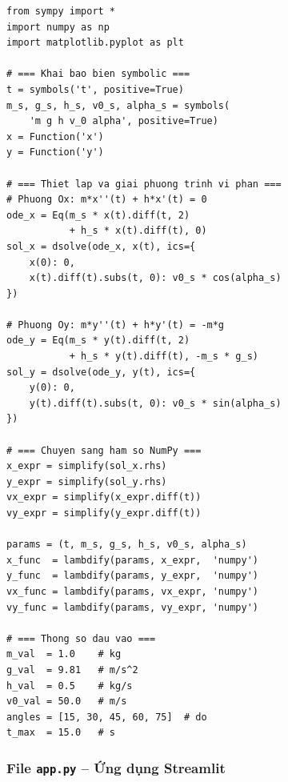 \begin{lstlisting}[style=pythonstyle, caption={Giải hệ phương trình vi phân và thiết lập hàm tính toán}]
from sympy import *
import numpy as np
import matplotlib.pyplot as plt

# === Khai bao bien symbolic ===
t = symbols('t', positive=True)
m_s, g_s, h_s, v0_s, alpha_s = symbols(
    'm g h v_0 alpha', positive=True)
x = Function('x')
y = Function('y')

# === Thiet lap va giai phuong trinh vi phan ===
# Phuong Ox: m*x''(t) + h*x'(t) = 0
ode_x = Eq(m_s * x(t).diff(t, 2) 
           + h_s * x(t).diff(t), 0)
sol_x = dsolve(ode_x, x(t), ics={
    x(0): 0,
    x(t).diff(t).subs(t, 0): v0_s * cos(alpha_s)
})

# Phuong Oy: m*y''(t) + h*y'(t) = -m*g
ode_y = Eq(m_s * y(t).diff(t, 2) 
           + h_s * y(t).diff(t), -m_s * g_s)
sol_y = dsolve(ode_y, y(t), ics={
    y(0): 0,
    y(t).diff(t).subs(t, 0): v0_s * sin(alpha_s)
})

# === Chuyen sang ham so NumPy ===
x_expr = simplify(sol_x.rhs)
y_expr = simplify(sol_y.rhs)
vx_expr = simplify(x_expr.diff(t))
vy_expr = simplify(y_expr.diff(t))

params = (t, m_s, g_s, h_s, v0_s, alpha_s)
x_func  = lambdify(params, x_expr,  'numpy')
y_func  = lambdify(params, y_expr,  'numpy')
vx_func = lambdify(params, vx_expr, 'numpy')
vy_func = lambdify(params, vy_expr, 'numpy')

# === Thong so dau vao ===
m_val  = 1.0    # kg
g_val  = 9.81   # m/s^2
h_val  = 0.5    # kg/s
v0_val = 50.0   # m/s
angles = [15, 30, 45, 60, 75]  # do
t_max  = 15.0   # s
\end{lstlisting}

\subsubsection{File \texttt{app.py} -- Ứng dụng Streamlit}

